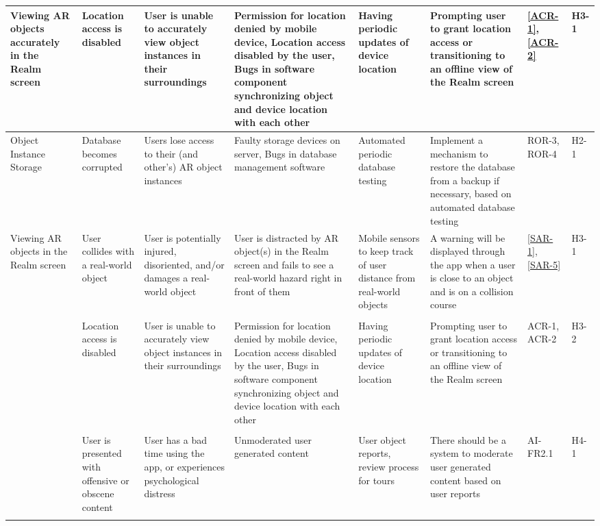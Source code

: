 \documentclass{article}
\begin{document}
\begin{landscape}
\begin{table}[hp]
\begin{footnotesize}
\begin{tabular}{|p{1in}|p{1in}|p{1.5in}|p{1.5in}|p{1.5in}|p{2in}|p{0.4in}|p{0.4in}|}
        \hline
        Viewing AR objects accurately in the Realm screen & Location access is disabled & User is unable to accurately view object instances in their surroundings & Permission for location denied by mobile device, Location access disabled by the user, Bugs in software component synchronizing object and device location with each other & Having periodic updates of device location & Prompting user to grant location access or transitioning to an offline view of the Realm screen & \ref{ACR-1}, \ref{ACR-2} & H3-1 \\
        \hline
        Object Instance Storage & Database becomes corrupted & Users lose access to their (and other's) AR object instances & Faulty storage devices on server, Bugs in database management software & Automated periodic database testing & Implement a mechanism to restore the database from a backup if necessary, based on automated database testing & ROR-3, ROR-4 & H2-1 \\
        \hline
        Viewing AR objects in the Realm screen & User collides with a real-world object & User is potentially injured, disoriented, and/or damages a real-world object & User is distracted by AR object(s) in the Realm screen and fails to see a real-world hazard right in front of them & Mobile sensors to keep track of user distance from real-world objects & A warning will be displayed through the app when a user is close to an object and is on a collision course & \ref{SAR-1}, \ref{SAR-5} & H3-1 \\
        & & & & & & & \\
        & Location access is disabled & User is unable to accurately view object instances in their surroundings & Permission for location denied by mobile device, Location access disabled by the user, Bugs in software component synchronizing object and device location with each other & Having periodic updates of device location & Prompting user to grant location access or transitioning to an offline view of the Realm screen & ACR-1, ACR-2 & H3-2 \\
        & & & & & & & \\
        & User is presented with offensive or obscene content & User has a bad time using the app, or experiences psychological distress & Unmoderated user generated content & User object reports, review process for tours & There should be a system to moderate user generated content based on user reports & AI-FR2.1 & H4-1 \\
        & & & & & & & \\

\end{tabular}
\end{footnotesize}
\end{table}
\end{landscape}
\end{document}
